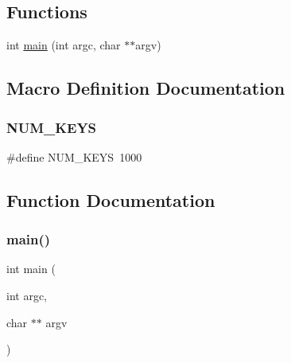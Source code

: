 \subsection*{Functions}
\begin{DoxyCompactItemize}
\item 
int \mbox{\hyperlink{adat-devel_2other__libs_2filedb_2src_2AllConfReadTest_8cpp_a3c04138a5bfe5d72780bb7e82a18e627}{main}} (int argc, char $\ast$$\ast$argv)
\end{DoxyCompactItemize}


\subsection{Macro Definition Documentation}
\mbox{\label{adat-devel_2other__libs_2filedb_2src_2AllConfReadTest_8cpp_a9a8c7403a867e0c9543467ee8754050d}} 
\subsubsection{\texorpdfstring{NUM\_KEYS}{NUM\_KEYS}}
{\footnotesize\ttfamily \#define N\+U\+M\+\_\+\+K\+E\+YS~1000}



\subsection{Function Documentation}
\mbox{\label{adat-devel_2other__libs_2filedb_2src_2AllConfReadTest_8cpp_a3c04138a5bfe5d72780bb7e82a18e627}} 
\subsubsection{\texorpdfstring{main()}{main()}}
{\footnotesize\ttfamily int main (\begin{DoxyParamCaption}\item[{int}]{argc,  }\item[{char $\ast$$\ast$}]{argv }\end{DoxyParamCaption})}

